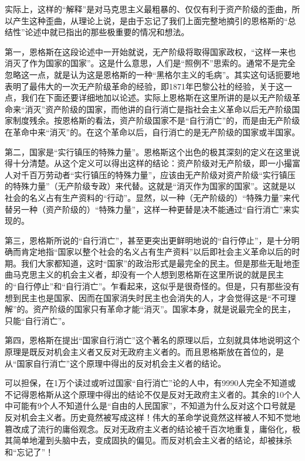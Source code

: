 \documentclass[UTF8, 12pt, a4paper]{ctexrep}
\begin{document}
实际上，这样的“解释”是对马克思主义最粗暴的、仅仅有利于资产阶级的歪曲，所以产生这种歪曲，从理论上说，是由于忘记了我们上面完整地摘引的恩格斯的“总结性”论述中就已指出的那些极重要的情况和想法。

第一，恩格斯在这段论述中一开始就说，无产阶级将取得国家政权，“这样一来也消灭了作为国家的国家”。这是什么意思，人们是“照例不”思索的。通常不是完全忽略这一点，就是认为这是恩格斯的一种“黑格尔主义的毛病”。其实这句话扼要地表明了最伟大的一次无产阶级革命的经验，即1871年巴黎公社的经验，关于这一点，我们在下面还要详细地加以论述。实际上恩格斯在这里所讲的是以无产阶级革命来“消灭”资产阶级的国家，而他讲的自行消亡是指社会主义革命以后无产阶级国家制度残余。按恩格斯的看法，资产阶级国家不是“自行消亡”的，而是由无产阶级在革命中来“消灭”的。在这个革命以后，自行消亡的是无产阶级的国家或半国家。

第二，国家是“实行镇压的特殊力量”。恩格斯这个出色的极其深刻的定义在这里说得十分清楚。从这个定义可以得出这样的结论：资产阶级对无产阶级，即一小撮富人对千百万劳动者“实行镇压的特殊力量”，应该由无产阶级对资产阶级“实行镇压的特殊力量”（无产阶级专政）来代替。这就是“消灭作为国家的国家”。这就是以社会的名义占有生产资料的“行动”。显然，以一种（无产阶级的）“特殊力量”来代替另一种（资产阶级的）“特殊力量”，这样一种更替是决不能通过“自行消亡”来实现的。

第三，恩格斯所说的“自行消亡”，甚至更突出更鲜明地说的“自行停止”，是十分明确而肯定地指“国家以整个社会的名义占有生产资料”以后即社会主义革命以后的时期。我们大家都知道，这时“国家”的政治形式是最完全的民主。但是那些无耻地歪曲马克思主义的机会主义者，却没有一个人想到恩格斯在这里所说的就是民主的“自行停止”和“自行消亡”。乍看起来，这似乎是很奇怪的。但是，只有那些没有想到民主也是国家、因而在国家消失时民主也会消失的人，才会觉得这是“不可理解”的。资产阶级的国家只有革命才能“消灭”。国家本身，就是说最完全的民主，只能“自行消亡”。

第四，恩格斯在提出“国家自行消亡”这个著名的原理以后，立刻就具体地说明这个原理是既反对机会主义者又反对无政府主义者的。而且恩格斯放在首位的，是从“国家自行消亡”这个原理中得出的反对机会主义者的结论。

可以担保，在1万个读过或听过国家“自行消亡”论的人中，有9990人完全不知道或不记得恩格斯从这个原理中得出的结论不仅是反对无政府主义者的。其余的10个人中可能有9个人不知道什么是“自由的人民国家”，不知道为什么反对这个口号就是反对机会主义者。历史竟然被写成这样！伟大的革命学说竟然这样被人不知不觉地篡改成了流行的庸俗观念。反对无政府主义者的结论被千百次地重复，庸俗化，极其简单地灌到头脑中去，变成固执的偏见。而反对机会主义者的结论，却被抹杀和“忘记了”！
\end{document}
